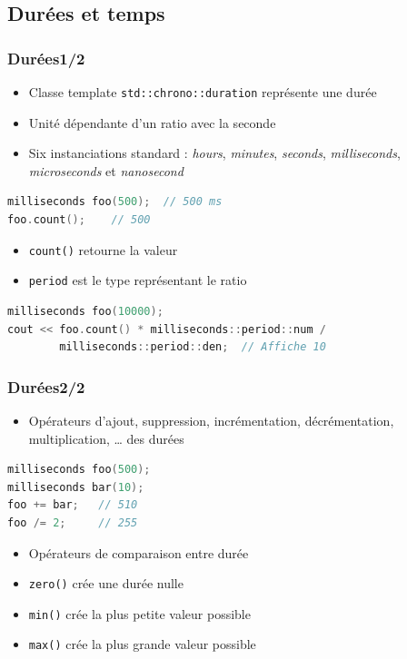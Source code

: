 \documentclass[C++.tex]{subfiles}
\begin{document}
\subsection*{Durées et temps}
\begin{frame}[fragile]
	\frametitle{Durées\titlehfill{}1/2}
	\begin{itemize}
		\item Classe template \lstinline|std::chrono::duration| représente une durée
		\item Unité dépendante d'un ratio avec la seconde
		\item Six instanciations standard : \textit{hours}, \textit{minutes}, \textit{seconds}, \textit{milliseconds}, \textit{microseconds} et \textit{nanosecond}
	\end{itemize}

	\begin{lstlisting}[language=C++]
milliseconds foo(500);  // 500 ms
foo.count();    // 500\end{lstlisting}

	\begin{itemize}
		\item \lstinline|count()| retourne la valeur
		\item \lstinline|period| est le type représentant le ratio
	\end{itemize}

	\begin{lstlisting}[language=C++]
milliseconds foo(10000);
cout << foo.count() * milliseconds::period::num / 
        milliseconds::period::den;  // Affiche 10\end{lstlisting}
\end{frame}

\begin{frame}[fragile]
	\frametitle{Durées\titlehfill{}2/2}
	\begin{itemize}
		\item Opérateurs d'ajout, suppression, incrémentation, décrémentation, multiplication, \ldots{} des durées
	\end{itemize}

	\begin{lstlisting}[language=C++]
milliseconds foo(500);
milliseconds bar(10);
foo += bar;   // 510
foo /= 2;     // 255\end{lstlisting}

	\begin{itemize}
		\item Opérateurs de comparaison entre durée
		\item \lstinline|zero()| crée une durée nulle
		\item \lstinline|min()| crée la plus petite valeur possible
		\item \lstinline|max()| crée la plus grande valeur possible
	\end{itemize}
\end{frame}
\end{document}

